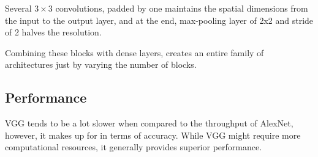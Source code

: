 \documentclass[11pt]{article}
\begin{document}
Several $3\times 3$ convolutions, padded by one maintains the spatial dimensions from the input to the output layer, and at the end, max-pooling layer of 2x2 and stride of 2 halves the resolution. 

Combining these blocks with dense layers, creates an entire family of architectures just by varying the number of blocks.

\subsection{Performance}

VGG tends to be a lot slower when compared to the throughput of AlexNet, however, it makes up for in terms of accuracy. While VGG might require more computational resources, it generally provides superior performance. 

\printbibliography
\end{document}
